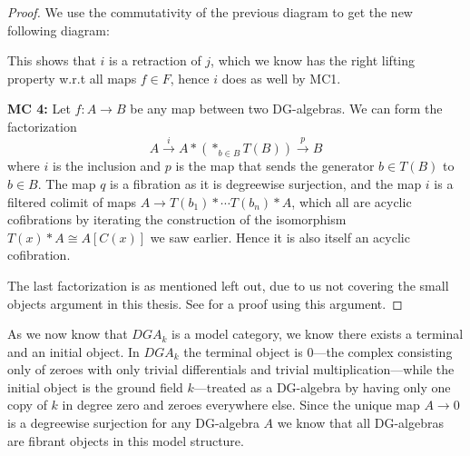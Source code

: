 \begin{proof}
We use the commutativity of the previous diagram to get the new following diagram: 
\begin{center}
\end{center}
This shows that $i$ is a retraction of $j$, which we know has the right lifting property w.r.t all maps $f\in F$, hence $i$ does as well by MC1.



\textbf{MC 4:} Let $f:A\longrightarrow B$ be any map between two DG-algebras. We can form the factorization 
\begin{equation*}
    A\overset{i}\longrightarrow A\ast (\ast_{b\in B} T(B))\overset{p}\longrightarrow B
\end{equation*}
where $i$ is the inclusion and $p$ is the map that sends the generator $b \in T(B)$ to $b\in B$. The map $q$ is a fibration as it is  degreewise surjection, and the map $i$ is a filtered colimit of maps $A\longrightarrow T(b_1)\ast \cdots T(b_n)\ast A$, which all are acyclic cofibrations by iterating the construction of the isomorphism $T(x)\ast A \cong A[C(x)]$ we saw earlier. Hence it is also itself an acyclic cofibration. 

The last factorization is as mentioned left out, due to us not covering the small objects argument in this thesis. See \cite[Lemma 3]{jardine} for a proof using this argument. 
\end{proof}


As we now know that $DGA_k$ is a model category, we know there exists a terminal and an initial object. In $DGA_k$ the terminal object is $0$---the complex consisting only of zeroes with only trivial differentials and trivial multiplication---while the initial object is the ground field $k$---treated as a DG-algebra by having only one copy of $k$ in degree zero and zeroes everywhere else. Since the unique map $A\longrightarrow 0$ is a degreewise surjection for any DG-algebra $A$ we know that all DG-algebras are fibrant objects in this model structure. 




